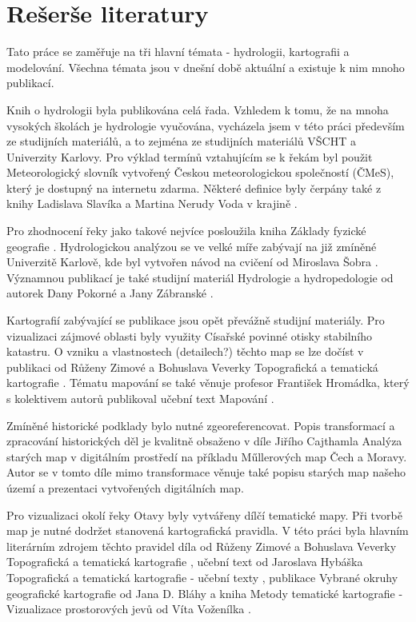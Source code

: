 \documentclass[thesis=M,czech]{FITthesis}[2012/06/26]
\begin{document}
\chapter{Rešerše literatury}
Tato práce se zaměřuje na tři hlavní témata - hydrologii, kartografii a modelování. Všechna témata jsou v dnešní době aktuální a existuje k nim mnoho publikací.

Knih o hydrologii byla publikována celá řada. Vzhledem k tomu, že na mnoha vysokých školách je hydrologie vyučována, vycházela jsem v této práci především ze studijních materiálů, a to zejména ze studijních materiálů VŠCHT a Univerzity Karlovy. Pro výklad termínů vztahujícím se k řekám byl použit Meteorologický slovník \cite{meteo} vytvořený Českou meteorologickou společností (ČMeS), který je dostupný na internetu zdarma. Některé definice byly čerpány také z knihy Ladislava Slavíka a Martina Nerudy Voda v krajině \cite{definiceHydro}. 

Pro zhodnocení řeky jako takové nejvíce posloužila kniha Základy fyzické geografie \cite{FGkniha}. Hydrologickou analýzou se ve velké míře zabývají na již zmíněné Univerzitě Karlově, kde byl vytvořen návod na cvičení od Miroslava Šobra \cite{UK}. Významnou publikací je také studijní materiál Hydrologie a hydropedologie od autorek Dany Pokorné a Jany Zábranské \cite{hydrovscht}. 

Kartografií zabývající se publikace jsou opět převážně studijní materiály. Pro vizualizaci zájmové oblasti byly využity Císařské povinné otisky stabilního katastru. O vzniku a vlastnostech (detailech?) těchto map se lze dočíst v publikaci od Růženy Zimové a Bohuslava Veverky Topografická a tematická kartografie \cite{topo_skripta}. Tématu mapování se také věnuje profesor František Hromádka, který s kolektivem autorů publikoval učební text Mapování \cite{mapovani_brno}.

Zmíněné historické podklady bylo nutné zgeoreferencovat. Popis transformací a zpracování historických děl je kvalitně obsaženo v díle Jiřího Cajthamla Analýza starých map v digitálním prostředí na příkladu Műllerových map Čech a Moravy\cite{transformace}. Autor se v tomto díle mimo transformace věnuje také popisu starých map našeho území a prezentaci vytvořených digitálních map.

Pro vizualizaci okolí řeky Otavy byly vytvářeny dílčí tematické mapy. Při tvorbě map je nutné dodržet stanovená kartografická pravidla. V této práci byla hlavním literárním zdrojem těchto pravidel díla od Růženy Zimové a Bohuslava Veverky Topografická a tematická kartografie \cite{topo_skripta}, učební text od Jaroslava Hybáška Topografická a tematická kartografie - učební texty \cite{tematicka_brno}, publikace Vybrané okruhy geografické kartografie od Jana D. Bláhy \cite{kartoblaha} a kniha Metody tematické kartografie - Vizualizace prostorových jevů od Víta Voženílka \cite{mapyolomouc}.
\end{document}
